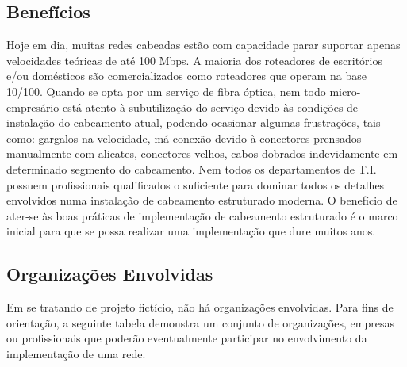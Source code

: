 \documentclass[	DIV=calc,%
							paper=a4,%
							fontsize=12pt,%
							onecolumn]{scrartcl}	 					%
\begin{document}
\subsection{Benefícios}
Hoje em dia, muitas redes cabeadas estão com capacidade parar suportar apenas velocidades teóricas de até 100 Mbps. A maioria dos roteadores de escritórios e/ou domésticos são comercializados como roteadores que operam na base 10/100. Quando se opta por um serviço de fibra óptica, nem todo micro-empresário está atento à subutilização do serviço devido às condições de instalação do cabeamento atual, podendo ocasionar algumas frustrações, tais como: gargalos na velocidade, má conexão devido à conectores prensados manualmente com alicates, conectores velhos, cabos dobrados indevidamente em determinado segmento do cabeamento. Nem todos os departamentos de T.I. possuem profissionais qualificados o suficiente para dominar todos os detalhes envolvidos numa instalação de cabeamento estruturado moderna. O benefício de ater-se às boas práticas de implementação de cabeamento estruturado é o marco inicial para que se possa realizar uma implementação que dure muitos anos.

\subsection{Organizações Envolvidas}
Em se tratando de projeto fictício, não há organizações envolvidas. Para fins de orientação, a seguinte tabela demonstra um conjunto de organizações, empresas ou profissionais que poderão eventualmente participar no envolvimento da implementação de uma rede.\\

\end{document}
